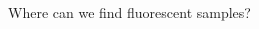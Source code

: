 \documentclass[presentation]{beamer}
\begin{document}
\begin{frame}{Where can we find fluorescent samples?}
\begin{columns}
\begin{column}{.33\textwidth}
      \\
    \end{column}
    \begin{column}{.33\textwidth}
      \centering
      \\ \vspace{0.2em}

\end{column}
\end{columns}
\end{frame}
\end{document}
